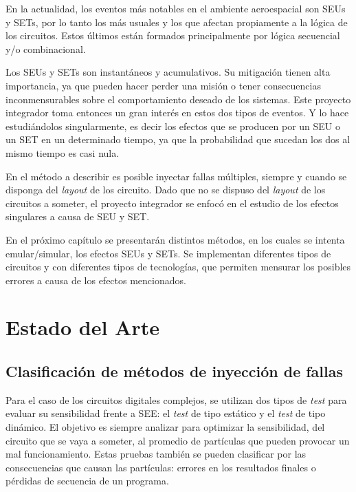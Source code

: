 \documentclass[a4paper,openright,12pt]{report}
\begin{document}
En la actualidad, los eventos más notables en el ambiente aeroespacial son SEUs y SETs, por lo tanto los más usuales y los que afectan propiamente a la lógica de los circuitos. Estos últimos están formados principalmente por lógica secuencial y/o combinacional. 

Los SEUs y SETs son instantáneos y acumulativos. Su mitigación tienen alta importancia, ya que pueden hacer perder una misión o tener consecuencias inconmensurables sobre el comportamiento deseado de los sistemas. Este proyecto integrador  toma entonces un gran interés en estos dos tipos de eventos. Y lo hace estudiándolos singularmente, es decir los efectos que se producen por un SEU o un SET en un determinado tiempo, ya que la probabilidad que sucedan los dos al mismo tiempo es casi nula.

En el método a describir es posible inyectar fallas múltiples, siempre y cuando se disponga del \textit{layout} de los circuito. Dado que no se dispuso del \textit{layout} de los circuitos a someter, el proyecto integrador se enfocó en el estudio de los efectos singulares a causa  de SEU y SET. 

En el próximo capítulo se presentarán distintos métodos, en los cuales se intenta emular/simular, los efectos  SEUs y SETs. Se implementan diferentes tipos de circuitos y con diferentes tipos de tecnologías, que permiten  mensurar los posibles errores a causa de los efectos mencionados. 


\chapter{Estado del Arte}



\section{Clasificación de métodos de inyección de fallas}


Para el caso de los circuitos digitales complejos, se utilizan  dos tipos de \textit{\textit{test}}  para evaluar su sensibilidad frente a SEE: el \textit{\textit{test}} de tipo estático y el \textit{\textit{test}} de tipo dinámico. El objetivo es siempre  analizar para optimizar la sensibilidad, del circuito que se vaya a someter, al promedio de partículas que pueden provocar un mal funcionamiento. Estas pruebas también se pueden clasificar por las consecuencias que causan las partículas: errores en los resultados finales o  pérdidas de secuencia de un programa.
\end{document}
